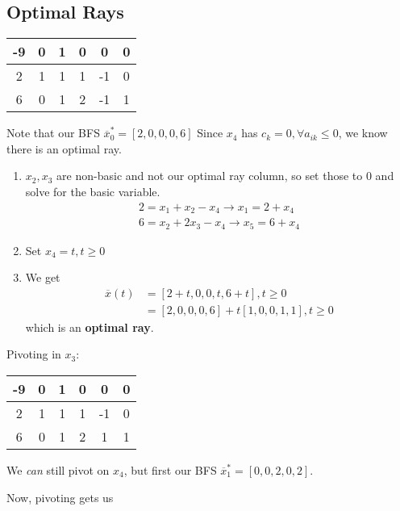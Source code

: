 \documentclass[10pt]{article}
\begin{document}
\begin{multicols*}{2}
    \begin{minipage}{\columnwidth}
        \subsection*{Optimal Rays}
        \begin{tabular}{c|ccccc}
            -9 & 0 & 1 & 0 & 0  & 0 \\
            \hline
            2  & 1 & 1 & 1 & -1 & 0 \\
            6  & 0 & 1 & 2 & -1 & 1
        \end{tabular}
        Note that our BFS \(\overline{x}_0^* = [2, 0, 0, 0, 6]\)
        Since \(x_4\) has \(c_k = 0, \forall a_{ik} \leq 0\), we know there is an optimal ray.
        \begin{enumerate}
            \item \(x_2, x_3\) are non-basic and not our optimal ray column, so set those to 0 and solve for the basic variable.
                  \begin{align*}
                      2 = x_1 + x_2 -x_4 \rightarrow x_1 = 2 + x_4 \\
                      6 = x_2 + 2x_3 - x_4 \rightarrow x_5 = 6 + x_4
                  \end{align*}
            \item Set \(x_4 = t, t \geq 0\)
            \item We get
                  \begin{align*}
                      \overline{x}(t) & = [2 + t, 0, 0, t, 6 + t], t \geq 0             \\
                                      & = [2, 0, 0, 0, 6] + t [1, 0, 0, 1, 1], t \geq 0
                  \end{align*}
                  which is an \textbf{optimal ray}.
        \end{enumerate}
        Pivoting in \(x_3\):

        \begin{tabular}{c|ccccc}
            -9 & 0 & 1 & 0 & 0  & 0 \\
            \hline
            2  & 1 & 1 & 1 & -1 & 0 \\
            6  & 0 & 1 & 2 & 1  & 1
        \end{tabular}
        We \textit{can} still pivot on \(x_4\), but first our BFS \(\overline{x}_1^* = [0, 0, 2, 0, 2]\).

        Now, pivoting gets us


\end{minipage}
\end{multicols*}
\end{document}
